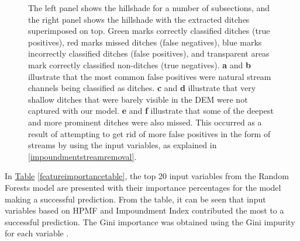 \documentclass[]{interact}
\theoremstyle{plain}%
\theoremstyle{definition}
\theoremstyle{remark}
\begin{document}
\begin{figure} [!htb]
    \caption{The left panel shows the hillshade for a number of subsections, and the right panel shows the hillshade with the extracted ditches superimposed on top. Green marks correctly classified ditches (true positives), red marks missed ditches (false negatives), blue marks incorrectly classified ditches (false positives), and transparent areas mark correctly classified non-ditches (true negatives). \textbf{a} and \textbf{b} illustrate that the most common false positives were natural stream channels being classified as ditches. \textbf{c} and \textbf{d} illustrate that very shallow ditches that were barely visible in the DEM were not captured with our model. \textbf{e} and \textbf{f} illustrate that some of the deepest and more prominent ditches were also missed. This occurred as a result of attempting to get rid of more false positives in the form of streams by using the input variables, as explained in \ref{impoundmentstreamremoval}.}
    \label{fig:resultsillustrations}
\end{figure}
\clearpage

In \hyperref[featureimportancetable]{Table} \ref{featureimportancetable}, the top 20 input variables from the Random Forests model are presented with their importance percentages for the model making a successful prediction. From the table, it can be seen that input variables based on HPMF and Impoundment Index contributed the most to a successful prediction. The Gini importance was obtained using the Gini impurity for each variable \citep{gini}.
\end{document}
